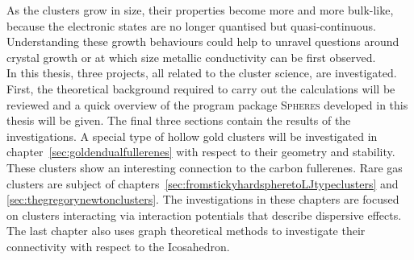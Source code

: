 As the clusters grow in size, their properties become more and more bulk-like,
because the electronic states are no longer quantised but quasi-continuous.
Understanding these growth behaviours could help to unravel questions around
crystal growth or at which size metallic conductivity can be first observed. 
\\\newline
In this thesis, three projects, all related to the cluster science, are
investigated. First, the theoretical background required to carry out the
calculations will be reviewed and a quick overview of the program package
\textsc{Spheres} developed in this thesis will be given. The final three
sections contain the results of the investigations. A special type of hollow
gold clusters will be investigated in chapter~\ref{sec:goldendualfullerenes}
with respect to their geometry and stability. These clusters show an interesting
connection to the carbon fullerenes. Rare gas clusters are subject of
chapters~\ref{sec:fromstickyhardspheretoLJtypeclusters} and
\ref{sec:thegregorynewtonclusters}. The investigations in these chapters are
focused on clusters interacting via interaction potentials that describe
dispersive effects. The last chapter also uses graph theoretical methods to
investigate their connectivity with respect to the Icosahedron.

